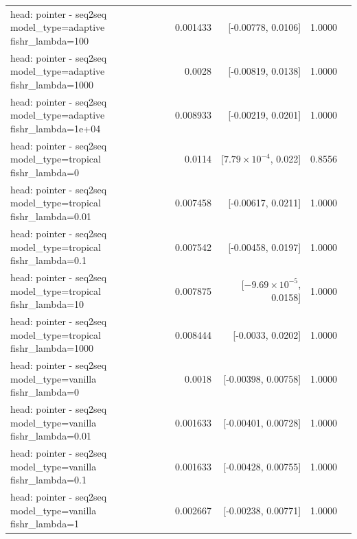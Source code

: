\documentclass[10pt]{article}
\makeatletter
\newcommand{\stackcell}[1]{\begin{tabular}[t]{@{}l@{}}#1\end{tabular}}
\makeatother
\begin{document}
{\begin{longtable}{lrrrl}
\stackcell{head: pointer - seq2seq\\\footnotesize model\_type=adaptive fishr\_lambda=100 } & 0.001433 & [-0.00778, 0.0106] & 1.0000 & \\
\stackcell{head: pointer - seq2seq\\\footnotesize model\_type=adaptive fishr\_lambda=1000 } & 0.0028 & [-0.00819, 0.0138] & 1.0000 & \\
\stackcell{head: pointer - seq2seq\\\footnotesize model\_type=adaptive fishr\_lambda=1e+04 } & 0.008933 & [-0.00219, 0.0201] & 1.0000 & \\
\stackcell{head: pointer - seq2seq\\\footnotesize model\_type=tropical fishr\_lambda=0 } & 0.0114 & [$7.79\times10^{-4}$, 0.022] & 0.8556 & \\
\stackcell{head: pointer - seq2seq\\\footnotesize model\_type=tropical fishr\_lambda=0.01 } & 0.007458 & [-0.00617, 0.0211] & 1.0000 & \\
\stackcell{head: pointer - seq2seq\\\footnotesize model\_type=tropical fishr\_lambda=0.1 } & 0.007542 & [-0.00458, 0.0197] & 1.0000 & \\
\stackcell{head: pointer - seq2seq\\\footnotesize model\_type=tropical fishr\_lambda=10 } & 0.007875 & [$-9.69\times10^{-5}$, 0.0158] & 1.0000 & \\
\stackcell{head: pointer - seq2seq\\\footnotesize model\_type=tropical fishr\_lambda=1000 } & 0.008444 & [-0.0033, 0.0202] & 1.0000 & \\
\stackcell{head: pointer - seq2seq\\\footnotesize model\_type=vanilla fishr\_lambda=0 } & 0.0018 & [-0.00398, 0.00758] & 1.0000 & \\
\stackcell{head: pointer - seq2seq\\\footnotesize model\_type=vanilla fishr\_lambda=0.01 } & 0.001633 & [-0.00401, 0.00728] & 1.0000 & \\
\stackcell{head: pointer - seq2seq\\\footnotesize model\_type=vanilla fishr\_lambda=0.1 } & 0.001633 & [-0.00428, 0.00755] & 1.0000 & \\
\stackcell{head: pointer - seq2seq\\\footnotesize model\_type=vanilla fishr\_lambda=1 } & 0.002667 & [-0.00238, 0.00771] & 1.0000 & \\

\end{longtable}}
\end{document}
